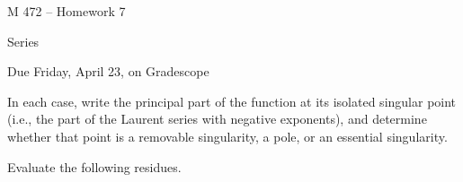\documentclass[11pt]{exam}
\newcommand{\ds}{\displaystyle}
\DeclareMathOperator*{\Res}{Res}
\begin{document}
\centerline{\Large M 472 -- Homework 7}
\vspace{2ex}
\centerline{\Large Series}
\vspace{3ex}
\centerline{Due Friday, April 23, on Gradescope}
\vspace{3ex}
\thispagestyle{empty}
\begin{questions}
  \question In each case, write the principal part of the function at
  its isolated singular point (i.e., the part of the Laurent series
  with negative exponents), and determine whether that point is a
  removable singularity, a pole, or an essential singularity.
  \begin{multicols}{2}
  \end{multicols}
  \question Evaluate the following residues.
  \begin{multicols}{2}
\end{multicols}
\end{questions}
\end{document}
